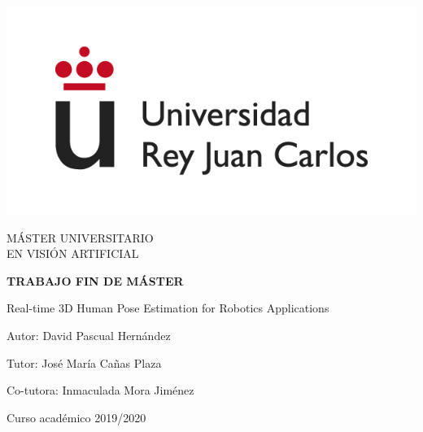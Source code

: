 \begin{titlepage}
	\begin{center}
		\vspace*{7.7mm}
		\begin{center}
			\includegraphics[width=0.4\linewidth]{figures/logo.jpg}
		\end{center}
		\vspace{6.5mm}
		
		\fontsize{14}{14}\selectfont MÁSTER UNIVERSITARIO \\ EN VISIÓN ARTIFICIAL

		\vspace{70pt}
		
		\fontsize{15.7}{14}\selectfont \textbf{TRABAJO FIN DE MÁSTER} 
		
		\vspace{25mm}
		\begin{huge}
    		Real-time 3D Human Pose Estimation
    		\vspace{1cm}
    		for Robotics Applications
		\end{huge}
		
		\vspace{25mm}
		
		\begin{large}
			Autor: David Pascual Hernández
			
			Tutor: José María Cañas Plaza
			
			Co-tutora: Inmaculada Mora Jiménez 
			
			\vspace{10mm}
		\end{large}
		\begin{normalsize}
			Curso académico 2019/2020
		\end{normalsize}
		\vspace{10mm}
		
	\end{center}
	
\end{titlepage}

\pagebreak
\thispagestyle{empty}
\vspace*{12cm}

